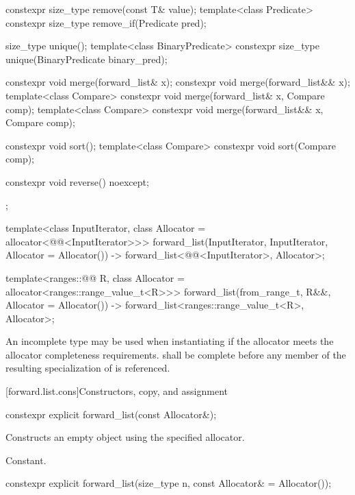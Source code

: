 \begin{codeblock}
{{    constexpr size_type remove(const T& value);
    template<class Predicate> constexpr size_type remove_if(Predicate pred);

    size_type unique();
    template<class BinaryPredicate> constexpr size_type unique(BinaryPredicate binary_pred);

    constexpr void merge(forward_list& x);
    constexpr void merge(forward_list&& x);
    template<class Compare> constexpr void merge(forward_list& x, Compare comp);
    template<class Compare> constexpr void merge(forward_list&& x, Compare comp);

    constexpr void sort();
    template<class Compare> constexpr void sort(Compare comp);

    constexpr void reverse() noexcept;
  };

  template<class InputIterator, class Allocator = allocator<@@<InputIterator>>>
    forward_list(InputIterator, InputIterator, Allocator = Allocator())
      -> forward_list<@@<InputIterator>, Allocator>;

  template<ranges::@@ R, class Allocator = allocator<ranges::range_value_t<R>>>
    forward_list(from_range_t, R&&, Allocator = Allocator())
      -> forward_list<ranges::range_value_t<R>, Allocator>;
}
\end{codeblock}

\pnum
An incomplete type  may be used when instantiating 
if the allocator meets the
allocator completeness requirements.
 shall be complete before any member of the resulting specialization
of  is referenced.

[forward.list.cons]{Constructors, copy, and assignment}

%
\begin{itemdecl}
constexpr explicit forward_list(const Allocator&);
\end{itemdecl}

\begin{itemdescr}
\pnum
\effects
Constructs an empty  object using the specified allocator.

\pnum
\complexity
Constant.
\end{itemdescr}

%
\begin{itemdecl}
constexpr explicit forward_list(size_type n, const Allocator& = Allocator());
\end{itemdecl}

